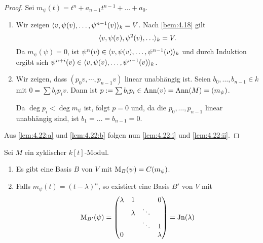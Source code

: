 \documentclass[12pt,a4paper]{scrartcl}
\theoremstyle{cplain}
\theoremstyle{cdef}
\begin{document}
\begin{proof}
	Sei $m_{\psi}(t) = t^n+a_{n-1}t^{n-1}+\ldots + a_0$.
	\begin{enumerate}[label=\alph*)]
		\item Wir zeigen $\langle v, \psi(v),\dots, \psi^{n-1}(v)\rangle_k = V$. Nach \cref{bem:4.18} gilt \[\<v, \psi(v),\psi^2(v),\dots\>_k = V.\] Da $m_{\psi}(\psi) = 0$, ist $\psi^n(v)\in \langle v, \psi(v),\dots, \psi^{n-1}(v)\rangle_k$ und durch Induktion ergibt sich $\psi^{n+i}(v) \in \langle v, \psi(v), \dots, \psi^{n-1}(v)\rangle_k$. \label{lem:4.22:a}
		\item Wir zeigen, dass $(p_0v,\cdots, p_{n-1}v)$ linear unabhängig ist. Seien $b_0,\dots, b_{n-1}\in k$ mit $0 = \sum b_ip_iv$. Dann ist $p := \sum b_ip_i\in \operatorname{Ann}(v) = \operatorname{Ann}(M) = (m_{\psi})$.
		
		Da $\deg p_i<\deg m_{\psi}$ ist, folgt $p = 0$ und, da die $p_0,\dots, p_{n-1}$ linear unabhängig sind, ist $b_1 =\dots = b_{n-1} = 0$. \label{lem:4.22:b}
	\end{enumerate}
Aus \ref{lem:4.22:a} und \ref{lem:4.22:b} folgen nun \ref{lem:4.22:i} und \ref{lem:4.22:ii}.
\end{proof}
\begin{lem} \label{lem:4.23}
	Sei $M$ ein zyklischer $k[t]$-Modul.
	\begin{enumerate}
		\item Es gibt eine Basis $B$ von $V$ mit $\operatorname{M}_B(\psi) =C(m_{\psi})$. \label{lem:4.23:i}
		\item Falls $m_{\psi}(t) = (t-\lambda)^n$, so existiert eine Basis $B'$ von $V$ mit 
		\[\operatorname{M}_{B'}(\psi) = \begin{pmatrix}
		\lambda & 1 &  & 0 \\ 
		& \lambda & \ddots &  \\ 
		&  & \ddots & 1 \\ 
		0 &  &  & \lambda
		\end{pmatrix} = \operatorname{Jn}(\lambda)\] \label{lem:4.23:ii}
	\end{enumerate}
\end{lem}
\end{document}
